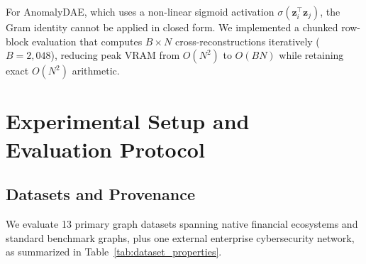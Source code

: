 \documentclass[11pt,a4paper]{article}
\begin{document}
For AnomalyDAE, which uses a non-linear sigmoid activation $\sigma(\mathbf{z}_i^\top \mathbf{z}_j)$, the Gram identity cannot be applied in closed form. We implemented a chunked row-block evaluation that computes $B \times N$ cross-reconstructions iteratively ($B=2,048$), reducing peak VRAM from $O(N^2)$ to $O(B N)$ while retaining exact $O(N^2)$ arithmetic.

\section{Experimental Setup and Evaluation Protocol}
\label{sec:experimental_setup}

\subsection{Datasets and Provenance}
We evaluate 13 primary graph datasets spanning native financial ecosystems and standard benchmark graphs, plus one external enterprise cybersecurity network, as summarized in Table~\ref{tab:dataset_properties}.
\end{document}
